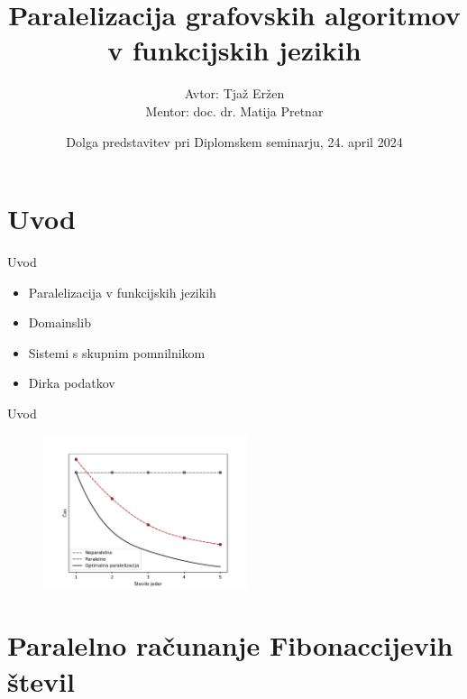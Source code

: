 \documentclass{beamer}
\title[Paralelizacija grafovskih algoritmov v funkcijskih jezikih]
{Paralelizacija grafovskih algoritmov v funkcijskih jezikih}
\author[Avtor: Tjaž Eržen, Mentor: doc. dr. Matija Pretnar]
{Avtor: Tjaž Eržen\\Mentor: doc. dr. Matija Pretnar}
\date[24. april 2024]
{Dolga predstavitev pri Diplomskem seminarju, 24. april 2024}
\begin{document}
\section{Uvod}

\begin{frame}
  \titlepage
\end{frame}

\begin{frame}
  \tableofcontents
\end{frame}


\begin{frame}{Uvod}
    \begin{itemize}
        \item Paralelizacija v funkcijskih jezikih
        \item Domainslib
        \item Sistemi s skupnim pomnilnikom
        \item Dirka podatkov
    \end{itemize}
\end{frame}

\begin{frame}{Uvod}
  \begin{figure}
    \includegraphics[width=6cm]{slike/cilj-casovne-zahtevnosti-paralelizacije.pdf}
  \end{figure}
\end{frame}

\section{Paralelno računanje Fibonaccijevih števil}
\end{document}
